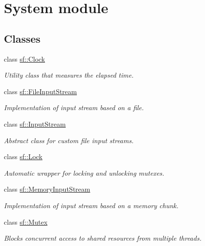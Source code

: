 \hypertarget{group__system}{}\section{System module}
\label{group__system}
\subsection*{Classes}
\begin{DoxyCompactItemize}
\item 
class \hyperlink{classsf_1_1_clock}{sf\+::\+Clock}
\begin{DoxyCompactList}\small\item\em Utility class that measures the elapsed time. \end{DoxyCompactList}\item 
class \hyperlink{classsf_1_1_file_input_stream}{sf\+::\+File\+Input\+Stream}
\begin{DoxyCompactList}\small\item\em Implementation of input stream based on a file. \end{DoxyCompactList}\item 
class \hyperlink{classsf_1_1_input_stream}{sf\+::\+Input\+Stream}
\begin{DoxyCompactList}\small\item\em Abstract class for custom file input streams. \end{DoxyCompactList}\item 
class \hyperlink{classsf_1_1_lock}{sf\+::\+Lock}
\begin{DoxyCompactList}\small\item\em Automatic wrapper for locking and unlocking mutexes. \end{DoxyCompactList}\item 
class \hyperlink{classsf_1_1_memory_input_stream}{sf\+::\+Memory\+Input\+Stream}
\begin{DoxyCompactList}\small\item\em Implementation of input stream based on a memory chunk. \end{DoxyCompactList}\item 
class \hyperlink{classsf_1_1_mutex}{sf\+::\+Mutex}
\begin{DoxyCompactList}\small\item\em Blocks concurrent access to shared resources from multiple threads. \end{DoxyCompactList}\item 

\end{DoxyCompactItemize}
